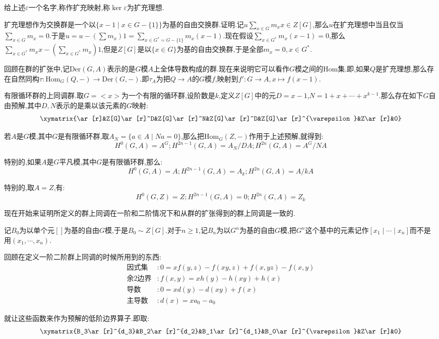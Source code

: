 给上述$\varepsilon$一个名字,称作扩充映射,称$\ker\varepsilon$为扩充理想.

扩充理想作为交换群是一个以$\{x-1\mid x\in G-\{1\}\}$为基的自由交换群.证明.记$u\sum_{x\in G}m_xx\in Z[G]$,那么$u$在扩充理想中当且仅当$\sum_ {x\in G}m_x=0$.于是$u=u-(\sum m_x)1=\sum_{x\in G^*=G-\{1\}}m_x(x-1)$.现在假设$\sum_{x\in G^*}m_x(x-1)=0$,那么$\sum_ {x\in G^*}m_xx-(\sum_{x\in G^*}m_x)1$,但是$Z[G]$是以$\{x\in G\}$为基的自由交换群,于是全部$m_x=0,x\in G^*$.

回顾在群的扩张中,记$\mathrm{Der}(G,A)$表示的是$G$模$A$上全体导数构成的群.现在来说明它可以看作$G$模之间的$\mathrm{Hom}$集.即,如果$Q$是扩充理想,那么存在自然同构$\tau:\mathrm{Hom} _G(Q,-)\to\mathrm{Der}(G,-)$.即$\tau_A$为把$Q\to A$的$G$模$f$,映射到$f':G\to A,x\mapsto f(x-1)$.

有限循环群的上同调群.取$G=<x>$为一个有限的循环群,设阶数是$k$,定义$Z[G]$中的元$D=x-1$,$N=1+x+\cdots+x^{k-1}$.那么存在如下$G$自由预解,其中$D,N$表示的是乘以该元素的$G$映射:
$$\xymatrix{\ar[r]&Z[G]\ar[r]^D&Z[G]\ar[r]^N&Z[G]\ar[r]^D&Z[G]\ar[r]^{\varepsilon}&Z\ar[r]&0}$$

若$A$是$G$模,其中$G$是有限循环群,取$A_N=\{a\in A\mid Na=0\}$,那么把$\mathrm{Hom}_G(Z,-)$作用于上述预解,就得到:
$$H^0(G,A)=A^G;H^{2n-1}(G,A)=A_N/DA;H^{2n}(G,A)=A^G/NA$$

特别的,如果$A$是$G$平凡模,其中$G$是有限循环群,那么:
$$H^0(G,A)=A;H^{2n-1}(G,A)=A_k;H^{2n}(G,A)=A/kA$$

特别的,取$A=Z$,有:
$$H^0(G,Z)=Z;H^{2n-1}(G,A)=0;H^{2n}(G,A)=Z_k$$

现在开始来证明所定义的群上同调在一阶和二阶情况下和从群的扩张得到的群上同调是一致的.

记$B_0$为以单个元$[]$为基的自由$G$模,于是$B_0\sim Z[G]$.对于$n\ge1$,记$B_n$为以$G^n$为基的自由$G$模,把$G^n$这个基中的元素记作$[x_1\mid\cdots\mid x_n]$而不是用$(x_1,\cdots,x_n)$.

回顾在定义一阶二阶群上同调的时候所用到的东西:
\begin{align*}
	\text{因式集} &: 0=xf(y,z)-f(xy,z)+f(x,yz)-f(x,y) \\
	\text{余2边界} &: f(x,y)=xh(y)-h(xy)+h(x) \\
	\text{导数}&: 0=xd(y)-d(xy)+f(x) \\
	\text{主导数} &: d(x)=xa_0-a_0
\end{align*}

就让这些函数来作为预解的低阶边界算子.即取:
$$\xymatrix{B_3\ar[r]^{d_3}&B_2\ar[r]^{d_2}&B_1\ar[r]^{d_1}&B_0\ar[r]^{\varepsilon}&Z\ar[r]&0}$$

